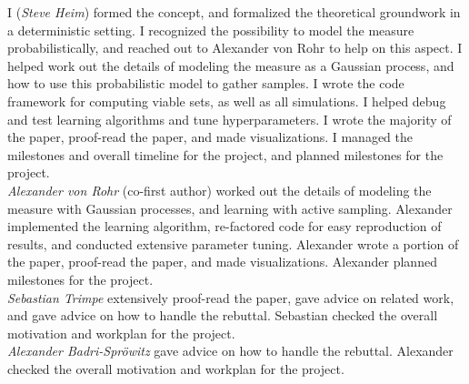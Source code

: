 I (\emph{Steve Heim}) formed the concept, and formalized the theoretical groundwork in a deterministic setting. I recognized the possibility to model the measure probabilistically, and reached out to Alexander von Rohr to help on this aspect. I helped work out the details of modeling the measure as a Gaussian process, and how to use this probabilistic model to gather samples. I wrote the code framework for computing viable sets, as well as all simulations. I helped debug and test learning algorithms and tune hyperparameters. I wrote the majority of the paper, proof-read the paper, and made visualizations. I managed the milestones and overall timeline for the project, and planned milestones for the project. \\
\emph{Alexander von Rohr} (co-first author) worked out the details of modeling the measure with Gaussian processes, and learning with active sampling. Alexander implemented the learning algorithm, re-factored code for easy reproduction of results, and conducted extensive parameter tuning. Alexander wrote a portion of the paper, proof-read the paper, and made visualizations. Alexander planned milestones for the project. \\
\emph{Sebastian Trimpe} extensively proof-read the paper, gave advice on related work, and gave advice on how to handle the rebuttal. Sebastian checked the overall motivation and workplan for the project. \\
\emph{Alexander Badri-Spr\"{o}witz} gave advice on how to handle the rebuttal. Alexander checked the overall motivation and workplan for the project.

